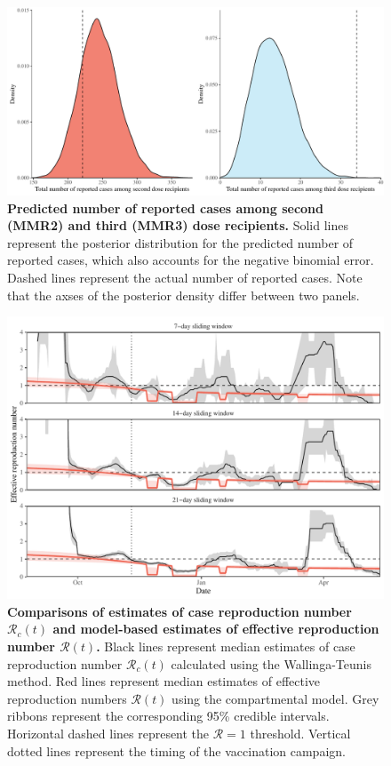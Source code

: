 \documentclass[12pt]{article}
\begin{document}
\pagebreak

\begin{figure}[!h]
\includegraphics[width=\textwidth]{../figure_stanfit_seirv_final/figure_stanfit_total.pdf}
\caption{
\textbf{Predicted number of reported cases among second (MMR2) and third (MMR3) dose recipients.}
Solid lines represent the posterior distribution for the predicted number of reported cases, which also accounts for the negative binomial error.
Dashed lines represent the actual number of reported cases.
Note that the axses of the posterior density differ between two panels.
}
\end{figure}

\pagebreak

\begin{figure}[!h]
\includegraphics[width=\textwidth]{../figure_stanfit_seirv_final/figure_stanfit_Rt_comp.pdf}
\caption{
\textbf{Comparisons of estimates of case reproduction number $\mathcal R_c(t)$ and model-based estimates of effective reproduction number $\mathcal R(t)$.}
Black lines represent median estimates of case reproduction number $\mathcal R_c(t)$ calculated using the Wallinga-Teunis method.
Red lines represent median estimates of effective reproduction numbers $\mathcal R(t)$ using the compartmental model.
Grey ribbons represent the corresponding 95\% credible intervals.
Horizontal dashed lines represent the $\mathcal R=1$ threshold.
Vertical dotted lines represent the timing of the vaccination campaign.
}
\end{figure}
\end{document}
